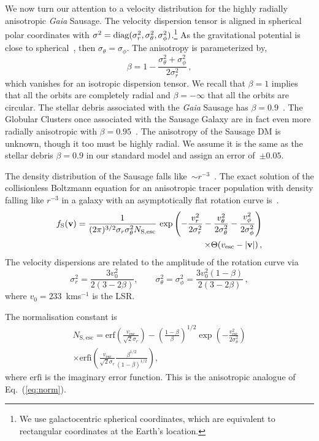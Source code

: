 \documentclass[prd,10pt,twocolumn,showpacs,nofootinbib, aps,superscriptaddress,preprintnumbers]{revtex4-1}
\newcommand{\vesc}{v_\mathrm{esc}}
\newcommand{\erf}{\mathrm{erf}}
\newcommand{\erfi}{\mathrm{erfi}}
\newcommand{\vbf}{\mathbf{v}}
\newcommand{\fS}{f_{\rm S}}
\begin{document}
We now turn our attention to a velocity distribution for the highly
radially anisotropic \emph{Gaia} Sausage. The velocity dispersion
tensor is aligned in spherical polar coordinates with $\sigma^2 = {\rm
  diag}(\sigma^2_r,\sigma^2_\theta, \sigma^2_\phi)$.\footnote{We use galactocentric spherical coordinates, which are equivalent to rectangular coordinates at the Earth's location.}  As the
gravitational potential is close to spherical~\cite{Ev16,We18}, then
$\sigma_\theta = \sigma_\phi$. The anisotropy is parameterized by,
%
\begin{equation}
  \beta = 1 - \frac{\sigma^2_\theta+\sigma_\phi^2}{2\sigma^2_r} \, ,
  \end{equation}
%
which vanishes for an isotropic dispersion tensor. We recall that
$\beta =1$ implies that all the orbits are completely radial and
$\beta = -\infty$ that all the orbits are circular. The stellar debris
associated with the \emph{Gaia} Sausage has $\beta =
0.9$~\cite{Be18,My18}. The Globular Clusters once associated with the
Sausage Galaxy are in fact even more radially anisotropic with $\beta
=0.95$~\cite{MyGC}. The anisotropy of the Sausage DM is unknown,
though it too must be highly radial. We assume it is the same as the
stellar debris $\beta = 0.9$ in our standard model and assign an error of~$\pm 0.05$.

The density distribution of the Sausage falls like~$\sim r^{-3}$~\citep{Io18}.
 The exact solution of the collisionless Boltzmann
equation for an anisotropic tracer population with density falling
like $r^{-3}$ in a galaxy with an asymptotically flat rotation
curve is~\citep{Ev97}.
%
\begin{align}\label{eq:sausage}
\fS(\vbf) =
\frac{1}{(2\pi)^{3/2}\sigma_r\sigma_\theta^2 N_\mathrm{S,esc}}
\, \exp \left( - \frac{v_r^2}{2\sigma_r^2}
-\frac{v_\theta^2}{2\sigma_\theta^2}- \frac{v_\phi^2}{2\sigma_\phi^2}
\right) \nonumber\\ \times \Theta (\vesc - |\vbf|)\,,
\end{align}
%
The velocity dispersions are related to the amplitude of the rotation
curve via~\citep{Ev97}
%
\begin{equation}\label{eq:disps}
  \sigma_r^2 = \frac{3v_0^2}{2(3-2\beta)},\qquad\sigma_\theta^2 =
  \sigma_\phi^2 = \frac{3 v_0^2(1-\beta)}{2(3-2\beta)}\,,
\end{equation}
%
where $v_0 =233$~kms$^{-1}$ is the LSR.

The normalisation constant is
%
\begin{align}
N_\mathrm{S,esc} = \erf \left( \frac{\vesc}{\sqrt{2}\sigma_r}\right) -
\left(\frac{1-\beta}{\beta}\right)^{1/2}
\exp \left(-\frac{\vesc^2}{2\sigma_\theta^2} \right)\nonumber\\
\times \erfi \left( \frac{\vesc}{\sqrt{2}\sigma_r}\frac{\beta^{1/2}}{(1-\beta)^{1/2}}\right),
\end{align}
%
where $\erfi$ is the imaginary error function. This is the anisotropic
analogue of Eq.~(\ref{eq:norm}).
\end{document}

